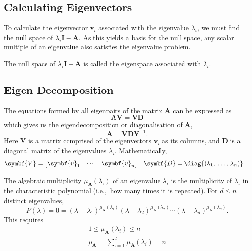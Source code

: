 \documentclass{article}
\begin{document}
\subsection{Calculating Eigenvectors}
To calculate the eigenvector \(\symbf{v}_i\) associated with the
eigenvalue \(\lambda_i\), we must find the null space of \(\lambda_i
\symbf{I} - \symbf{A}\). As this yields a basis for the null space, any
scalar multiple of an eigenvalue also satisfies the eigenvalue problem.
\begin{definition}[Eigenspace]
    The null space of \(\lambda_i \symbf{I} - \symbf{A}\) is called the eigenspace associated with \(\lambda_i\).
\end{definition}
\subsection{Eigen Decomposition}
The equations formed by all eigenpairs of the matrix \(\symbf{A}\) can
be expressed as
\begin{equation*}
    \symbf{A} \symbf{V} = \symbf{V} \symbf{D}
\end{equation*}
which gives us the eigendecomposition or diagonalisation of \(\symbf{A}\),
\begin{equation*}
    \symbf{A} = \symbf{V} \symbf{D} \symbf{V}^{-1}.
\end{equation*}
Here \(\symbf{V}\) is a matrix comprised of the eigenvectors \(\symbf{v}_i\) as its columns, and \(\symbf{D}\) is a
diagonal matrix of the eigenvalues \(\lambda_i\). Mathematically,
\begin{align*}
    \symbf{V} & =
    \begin{bmatrix}
        \symbf{v}_1 & \cdots & \symbf{v}_n
    \end{bmatrix}
              & \symbf{D} & = \diag{\left( \lambda_1,\: \dots,\: \lambda_n \right)}
\end{align*}
\begin{definition}
    The algebraic multiplicity \(\mu_{\symbf{A}}\left( \lambda_i \right)\)
    of an eigenvalue \(\lambda_i\) is
    the multiplicity of \(\lambda_i\) in the characteristic polynomial
    (i.e.,\ how many times it is repeated).
    For \(d \leq n\) distinct eigenvalues,
    \begin{equation*}
        P\left( \lambda \right) = 0 = \left( \lambda - \lambda_1 \right)^{\mu_{\symbf{A}}\left( \lambda_1 \right)} \left( \lambda - \lambda_2 \right)^{\mu_{\symbf{A}}\left( \lambda_2 \right)} \cdots \left( \lambda - \lambda_d \right)^{\mu_{\symbf{A}}\left( \lambda_d \right)}.
    \end{equation*}
    This requires
    \begin{gather*}
        1 \leq \mu_{\symbf{A}}\left( \lambda_i \right) \leq n         \\
        \mu_{\symbf{A}} = \sum_{i = 1}^d \mu_{\symbf{A}} \left( \lambda_i \right) = n
    \end{gather*}
\end{definition}
\end{document}
